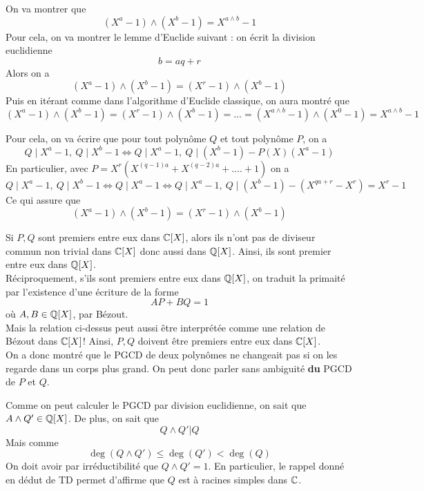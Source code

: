 \begin{sol}
On va montrer que
$$(X^a-1)\wedge (X^b-1)=X^{a\wedge b}-1 $$
Pour cela, on va montrer le lemme d'Euclide suivant : on écrit la division euclidienne
$$b=aq+r $$ Alors on a
$$(X^a-1)\wedge (X^b-1)=(X^r-1)\wedge (X^b-1) $$
Puis en itérant comme dans l'algorithme d'Euclide classique, on aura montré que
$$(X^a-1)\wedge (X^b-1)=(X^r-1)\wedge (X^b-1)=\dots=(X^{a\wedge b}-1)\wedge (X^0-1)=X^{a\wedge b}-1 $$

Pour cela, on va écrire que pour tout polynôme $Q$ et tout polynôme $P$, on a
$$Q\mid X^a-1, \: Q\mid X^b-1\iff Q\mid X^a-1, \: Q\mid (X^b-1)-P(X)(X^a-1) $$
En particulier, avec $P=X^r(X^{(q-1)a}+X^{(q-2)a}+\dots.+1)$ on a
$$Q\mid X^a-1, \: Q\mid X^b-1\iff Q\mid X^a-1 \iff Q\mid X^a-1, \: Q\mid (X^b-1)-(X^{qa+r}-X^r)=X^r-1$$
Ce qui assure que
$$(X^a-1)\wedge (X^b-1)=(X^r-1)\wedge (X^b-1) $$
\end{sol}


\begin{sol}
Si $P,Q$ sont premiers entre eux dans $\mathbb C[X]$, alors ils n'ont pas de diviseur commun non trivial dans $\mathbb C[X]$ donc aussi dans $\mathbb Q[X]$. Ainsi, ils sont premier entre eux dans $\mathbb Q[X]$. \\
Réciproquement, s'ils sont premiers entre eux dans $\mathbb Q[X]$, on traduit la primaité par l'existence d'une écriture de la forme
$$AP+BQ=1 $$
où $A,B\in \mathbb Q[X]$, par Bézout. \\
Mais la relation ci-dessus peut aussi être interprétée comme une relation de Bézout dans $\mathbb C[X]$! Ainsi, $P,Q$ doivent être premiers entre eux dans $\mathbb C[X]$. \\
On a donc montré que le PGCD de deux polynômes ne changeait pas si on les regarde dans un corps plus grand. On peut donc parler sans ambiguité \textbf{du} PGCD de $P$ et $Q$.
\end{sol}


\begin{sol}
Comme on peut calculer le PGCD par division euclidienne, on sait que $A\wedge Q'\in \mathbb Q[X]$. De plus, on sait que
$$Q\wedge Q'|Q $$ Mais comme
$$\deg(Q\wedge Q')\le \deg(Q')<\deg(Q) $$
On doit avoir par irréductibilité que $Q\wedge Q'=1$. En particulier, le rappel donné en dédut de TD permet d'affirme que $Q$ est à racines simples dans $\mathbb C$.
\end{sol}


